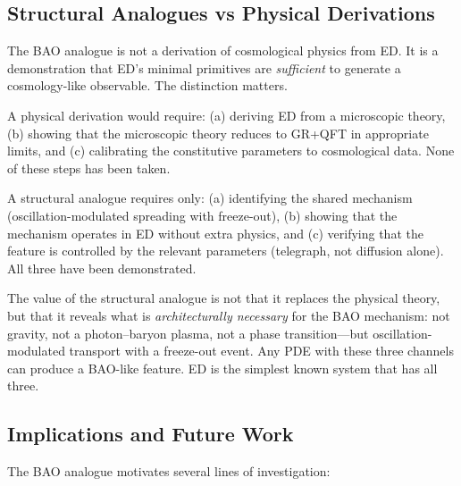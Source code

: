\documentclass[11pt]{article}
\begin{document}
\subsection{Structural Analogues vs Physical Derivations}

The BAO analogue is not a derivation of cosmological physics from ED. It is a demonstration that ED's minimal primitives are \emph{sufficient} to generate a cosmology-like observable. The distinction matters.

A physical derivation would require: (a) deriving ED from a microscopic theory, (b) showing that the microscopic theory reduces to GR+QFT in appropriate limits, and (c) calibrating the constitutive parameters to cosmological data. None of these steps has been taken.

A structural analogue requires only: (a) identifying the shared mechanism (oscillation-modulated spreading with freeze-out), (b) showing that the mechanism operates in ED without extra physics, and (c) verifying that the feature is controlled by the relevant parameters (telegraph, not diffusion alone). All three have been demonstrated.

The value of the structural analogue is not that it replaces the physical theory, but that it reveals what is \emph{architecturally necessary} for the BAO mechanism: not gravity, not a photon--baryon plasma, not a phase transition---but oscillation-modulated transport with a freeze-out event. Any PDE with these three channels can produce a BAO-like feature. ED is the simplest known system that has all three.

\subsection{Implications and Future Work}

The BAO analogue motivates several lines of investigation:
\end{document}
